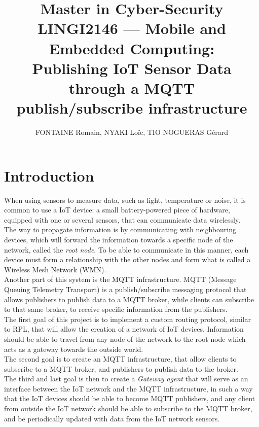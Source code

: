 \documentclass[a4paper,11pt]{article}
\title{Master in Cyber-Security\\
	LINGI2146 --- Mobile and Embedded Computing: \\
	Publishing IoT Sensor Data through a MQTT publish/subscribe infrastructure}
\author{FONTAINE Romain, NYAKI Loïc, TIO NOGUERAS Gérard}
\begin{document}
\maketitle
\newpage
\tableofcontents

\newpage

\section{Introduction}
When using sensors to measure data, such as light, temperature or noise, it is common to use a IoT device: a small battery-powered piece of hardware, equipped with one or several sensors, that can communicate data wirelessly.\\

The way to propagate information is by communicating with neighbouring devices, which will forward the information towards a specific node of the network, called the \textit{root node}. To be able to communicate in this manner, each device must form a relationship with the other nodes and form what is called a Wireless Mesh Network (WMN).\\

Another part of this system is the MQTT infrastructure. MQTT (Message Queuing Telemetry Transport) is a publish/subscribe messaging protocol that allows publishers to publish data to a MQTT broker, while clients can subscribe to that same broker, to receive specific information from the publishers.\\

The first goal of this project is to implement a custom routing protocol, similar to RPL, that will allow the creation of a network of IoT devices. Information should be able to travel from any node of the network to the root node which acts as a gateway towards the outside world. \\

The second goal is to create an MQTT infrastructure, that allow clients to subscribe to a MQTT broker, and publishers to publish data to the broker.\\

The third and last goal is then to create a \textit{Gateway agent} that will serve as an interface between the IoT network and the MQTT infrastructure, in such a way that the IoT devices should be able to become MQTT publishers, and any client from outside the IoT network should be able to subscribe to the MQTT broker, and be periodically updated with data from the IoT network sensors.
\end{document}
